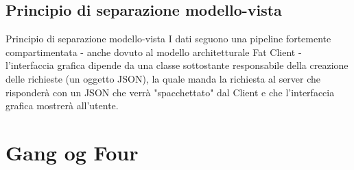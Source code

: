 \documentclass{beamer}
\begin{document}
\subsection{Principio di separazione modello-vista}
\begin{frame}{Principio di separazione modello-vista}
I dati seguono una pipeline fortemente compartimentata - anche dovuto al modello architetturale Fat Client - l'interfaccia grafica dipende da una classe sottostante responsabile della creazione delle richieste (un oggetto JSON), la quale manda la richiesta al server che risponderà con un JSON che verrà "spacchettato" dal Client e che l'interfaccia grafica mostrerà all'utente.
\end{frame}

\section{Gang og Four}

\end{document}

